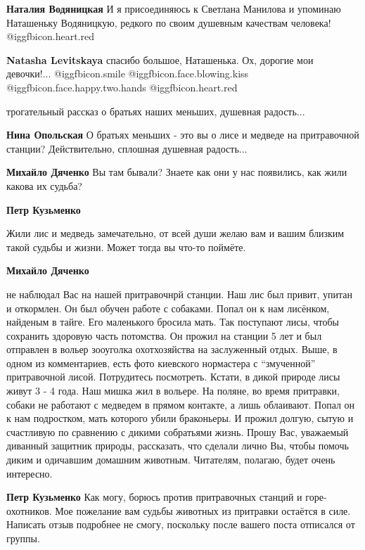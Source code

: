 \begin{itemize}
\begin{itemize}
\begin{itemize}
\textbf{Наталия Водяницкая}
И я присоединяюсь к Светлана Манилова и упоминаю Наташеньку Водяницкую, редкого по своим душевным качествам человека! @igg{fbicon.heart.red}

\textbf{Natasha Levitskaya} спасибо большое, Наташенька. Ох, дорогие мои девочки!... @igg{fbicon.smile}  @igg{fbicon.face.blowing.kiss}  @igg{fbicon.face.happy.two.hands} @igg{fbicon.heart.red}
\end{itemize} %


трогательный рассказ о братьях наших меньших, душевная радость...

\begin{itemize} %
\textbf{Нина Опольская} О братьях меньших - это вы о лисе и медведе на притравочной станции? Действительно, сплошная душевная радость...

\textbf{Михайло Дяченко} Вы там бывали? Знаете как они у нас появились, как жили какова их судьба?

\textbf{Петр Кузьменко} 

Жили лис и медведь замечательно, от всей души желаю вам и вашим близким такой
судьбы и жизни. Может тогда вы что-то поймёте.

\textbf{Михайло Дяченко} 

не наблюдал Вас на нашей притравочнрй станции. Наш лис был привит, упитан и
откормлен. Он был обучен работе с собаками. Попал он к нам лисёнком, найденым в
тайге. Его маленького бросила мать. Так поступают лисы, чтобы сохранить
здоровую часть потомства. Он прожил на станции 5 лет и был отправлен в вольер
зооуголка охотхозяйства на заслуженный отдых. Выше, в одном из комментариев,
есть фото киевского нормастера с \enquote{змученной} притравочной лисой. Потрудитесь
посмотреть. Кстати, в дикой природе лисы живут 3 - 4 года. Наш мишка жил в
вольере. На поляне, во время притравки, собаки не работают с медведем в прямом
контакте, а лишь облаивают. Попал он к нам подростком, мать которого убили
браконьеры. И прожил долгую, сытую и счастливую по сравнению с дикими
собратьями жизнь. Прошу Вас, уважаемый диванный защитник природы, рассказать,
что сделали лично Вы, чтобы помочь диким и одичавшим домашним животным.
Читателям, полагаю, будет очень интересно.

\textbf{Петр Кузьменко} Как могу, борюсь против притравочных станций и горе-охотников. Мое пожелание вам судьбы животных из притравки остаётся в силе. Написать отзыв подробнее не смогу, поскольку после вашего поста отписался от группы.
\end{itemize} %


\end{itemize}
\end{itemize}
